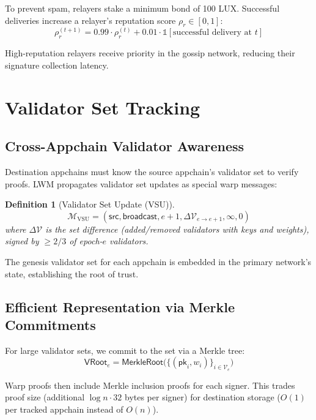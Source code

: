 \documentclass[11pt,a4paper]{article}
\newtheorem{definition}{Definition}
\begin{document}
To prevent spam, relayers stake a minimum bond of 100 LUX. Successful deliveries increase a relayer's reputation score $\rho_r \in [0, 1]$:
\begin{equation}
    \rho_r^{(t+1)} = 0.99 \cdot \rho_r^{(t)} + 0.01 \cdot \mathbb{1}[\text{successful delivery at } t]
\end{equation}

High-reputation relayers receive priority in the gossip network, reducing their signature collection latency.

\section{Validator Set Tracking}\label{sec:tracking}

\subsection{Cross-Appchain Validator Awareness}

Destination appchains must know the source appchain's validator set to verify proofs. LWM propagates validator set updates as special warp messages:

\begin{definition}[Validator Set Update (VSU)]
\begin{equation}
    \mathcal{M}_{\text{VSU}} = (\mathsf{src}, \mathsf{broadcast}, e{+}1, \Delta\mathcal{V}_{e \to e+1}, \infty, 0)
\end{equation}
where $\Delta\mathcal{V}$ is the set difference (added/removed validators with keys and weights), signed by $\geq 2/3$ of epoch-$e$ validators.
\end{definition}

The genesis validator set for each appchain is embedded in the primary network's state, establishing the root of trust.

\subsection{Efficient Representation via Merkle Commitments}

For large validator sets, we commit to the set via a Merkle tree:
\begin{equation}
    \mathsf{VRoot}_e = \mathsf{MerkleRoot}\bigl(\{(\mathsf{pk}_i, w_i)\}_{i \in \mathcal{V}_e}\bigr)
\end{equation}

Warp proofs then include Merkle inclusion proofs for each signer. This trades proof size (additional $\log n \cdot 32$ bytes per signer) for destination storage ($O(1)$ per tracked appchain instead of $O(n)$).
\end{document}

